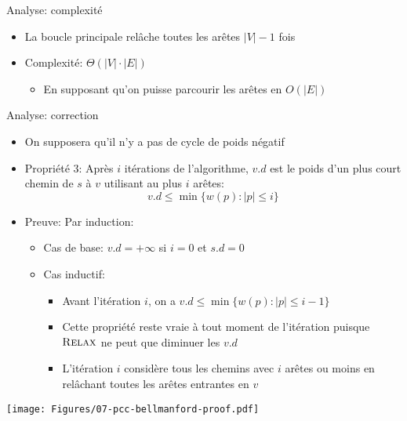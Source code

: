 \begin{frame}{Analyse: complexité}

\begin{center}
{\small
{}}
\end{center}

\begin{itemize}
\item La boucle principale relâche toutes les arêtes $|V|-1$ fois
\item Complexité: $\Theta(|V|\cdot |E|)$
\begin{itemize}
\item En supposant qu'on puisse parcourir les arêtes en $O(|E|)$
\end{itemize}
\end{itemize}

\end{frame}

\begin{frame}{Analyse: correction}

\begin{itemize}
\item On supposera qu'il n'y a pas de cycle de poids négatif
\item Propriété 3: Après $i$ itérations de l'algorithme, $v.d$ est le
  poids d'un plus court chemin de $s$ à $v$ utilisant au plus $i$ arêtes:
$$v.d\leq \min\{w(p): |p|\leq i\}$$
\item Preuve: Par induction:
\begin{itemize}
\item Cas de base: $v.d=+\infty$ si $i=0$ et $s.d=0$
\item Cas inductif:
\begin{itemize}
\item Avant l'itération $i$, on a $v.d\leq \min\{w(p):|p|\leq i-1\}$
\item Cette propriété reste vraie à tout moment de l'itération puisque
  $\textnormal{\scshape Relax}$ ne peut que diminuer les $v.d$
\item L'itération $i$ considère tous les chemins avec $i$ arêtes ou
  moins en relâchant toutes les arêtes entrantes en $v$
\end{itemize}
\end{itemize}
\end{itemize}

\centerline{\texttt{[image: Figures/07-pcc-bellmanford-proof.pdf]}}


\end{frame}

